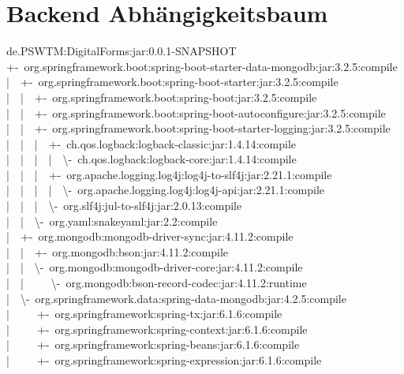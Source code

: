 \documentclass[
    paper=a4,
    twoside=false,
    parskip=half,
    listof=entryprefix,
    listof=totoc,
    index=totoc,
    bibliography=totoc,
    headsepline,
]{scrbook}
\begin{document}
    \section{Backend Abhängigkeitsbaum}\label{sec:backend-abhangigkeitsbaum}
    de.PSWTM:DigitalForms:jar:0.0.1-SNAPSHOT\\
    +-~org.springframework.boot:spring-boot-starter-data-mongodb:jar:3.2.5:compile\\
    |~~+-~org.springframework.boot:spring-boot-starter:jar:3.2.5:compile\\
    |~~|~~+-~org.springframework.boot:spring-boot:jar:3.2.5:compile\\
    |~~|~~+-~org.springframework.boot:spring-boot-autoconfigure:jar:3.2.5:compile\\
    |~~|~~+-~org.springframework.boot:spring-boot-starter-logging:jar:3.2.5:compile\\
    |~~|~~|~~+-~ch.qos.logback:logback-classic:jar:1.4.14:compile\\
    |~~|~~|~~|~~\textbackslash-~ch.qos.logback:logback-core:jar:1.4.14:compile\\
    |~~|~~|~~+-~org.apache.logging.log4j:log4j-to-slf4j:jar:2.21.1:compile\\
    |~~|~~|~~|~~\textbackslash-~org.apache.logging.log4j:log4j-api:jar:2.21.1:compile\\
    |~~|~~|~~\textbackslash-~org.slf4j:jul-to-slf4j:jar:2.0.13:compile\\
    |~~|~~\textbackslash-~org.yaml:snakeyaml:jar:2.2:compile\\
    |~~+-~org.mongodb:mongodb-driver-sync:jar:4.11.2:compile\\
    |~~|~~+-~org.mongodb:bson:jar:4.11.2:compile\\
    |~~|~~\textbackslash-~org.mongodb:mongodb-driver-core:jar:4.11.2:compile\\
    |~~|~~~~~\textbackslash-~org.mongodb:bson-record-codec:jar:4.11.2:runtime\\
    |~~\textbackslash-~org.springframework.data:spring-data-mongodb:jar:4.2.5:compile\\
    |~~~~~+-~org.springframework:spring-tx:jar:6.1.6:compile\\
    |~~~~~+-~org.springframework:spring-context:jar:6.1.6:compile\\
    |~~~~~+-~org.springframework:spring-beans:jar:6.1.6:compile\\
    |~~~~~+-~org.springframework:spring-expression:jar:6.1.6:compile\\
\end{document}
